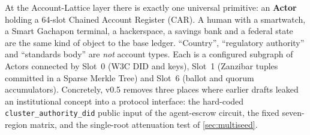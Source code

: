 \documentclass[a4paper,11pt,twoside,parskip=half-,headings=small]{scrartcl}
\newcommand{\code}[1]{\texttt{#1}}
\begin{document}
At the Account-Lattice layer there is exactly one universal primitive: an \textbf{Actor} holding a
64-slot Chained Account Register (CAR). A human with a smartwatch, a Smart Gachapon terminal, a hackerspace, a
savings bank and a federal state are the same kind of object to the base ledger. ``Country'',
``regulatory authority'' and ``standards body'' are \emph{not} account types. Each is a configured
subgraph of Actors connected by Slot~0 (W3C DID and keys), Slot~1 (Zanzibar tuples committed in a Sparse
Merkle Tree) and Slot~6 (ballot and quorum accumulators). Concretely, v0.5 removes three places where earlier
drafts leaked an institutional concept into a protocol interface: the hard-coded \code{cluster\_authority\_did}
public input of the agent-escrow circuit, the fixed seven-region matrix, and the single-root attenuation test of
\cref{sec:multiseed}.
\end{document}

